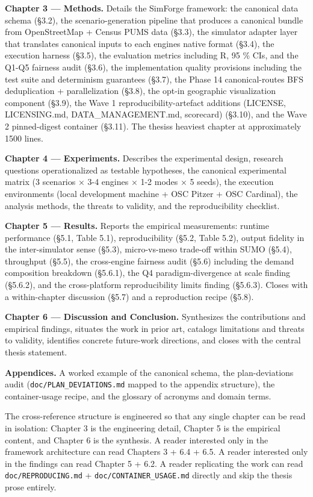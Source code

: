 \textbf{Chapter 3 --- Methods.} Details the SimForge framework: the
canonical data schema (§3.2), the scenario-generation pipeline that
produces a canonical bundle from OpenStreetMap + Census PUMS data
(§3.3), the simulator adapter layer that translates canonical inputs to
each engine\textquotesingle s native format (§3.4), the execution
harness (§3.5), the evaluation metrics including R, 95 \% CIs, and the
Q1-Q5 fairness audit (§3.6), the implementation quality provisions
including the test suite and determinism guarantees (§3.7), the Phase 14
canonical-routes BFS deduplication + parallelization (§3.8), the opt-in
geographic visualization component (§3.9), the Wave 1
reproducibility-artefact additions (LICENSE, LICENSING.md,
DATA\_MANAGEMENT.md, scorecard) (§3.10), and the Wave 2 pinned-digest
container (§3.11). The thesis\textquotesingle s heaviest chapter at
approximately 1500 lines.

\textbf{Chapter 4 --- Experiments.} Describes the experimental design,
research questions operationalized as testable hypotheses, the canonical
experimental matrix (3 scenarios × 3-4 engines × 1-2 modes × 5 seeds),
the execution environments (local development machine + OSC Pitzer + OSC
Cardinal), the analysis methods, the threats to validity, and the
reproducibility checklist.

\textbf{Chapter 5 --- Results.} Reports the empirical measurements:
runtime performance (§5.1, Table 5.1), reproducibility (§5.2, Table
5.2), output fidelity in the inter-simulator sense (§5.3), micro-vs-meso
trade-off within SUMO (§5.4), throughput (§5.5), the cross-engine
fairness audit (§5.6) including the demand composition breakdown
(§5.6.1), the Q4 paradigm-divergence at scale finding (§5.6.2), and the
cross-platform reproducibility limits finding (§5.6.3). Closes with a
within-chapter discussion (§5.7) and a reproduction recipe (§5.8).

\textbf{Chapter 6 --- Discussion and Conclusion.} Synthesizes the
contributions and empirical findings, situates the work in prior art,
catalogs limitations and threats to validity, identifies concrete
future-work directions, and closes with the central thesis statement.

\textbf{Appendices.} A worked example of the canonical schema, the
plan-deviations audit (\texttt{doc/PLAN\_DEVIATIONS.md} mapped
to the appendix structure), the container-usage recipe, and the glossary
of acronyms and domain terms.

The cross-reference structure is engineered so that any single chapter
can be read in isolation: Chapter 3 is the engineering detail, Chapter 5
is the empirical content, and Chapter 6 is the synthesis. A reader
interested only in the framework architecture can read Chapters 3 + 6.4
+ 6.5. A reader interested only in the findings can read Chapter 5 +
6.2. A reader replicating the work can read \texttt{doc/REPRODUCING.md}
+ \texttt{doc/CONTAINER\_USAGE.md} directly and skip the thesis prose
entirely.

